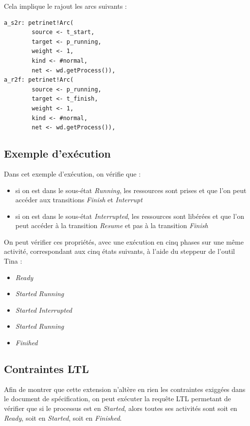 Cela implique le rajout les arcs suivants :
\begin{verbatim}
a_s2r: petrinet!Arc(
        source <- t_start,
        target <- p_running,
        weight <- 1,
        kind <- #normal,
        net <- wd.getProcess()),
a_r2f: petrinet!Arc(
        source <- p_running,
        target <- t_finish,
        weight <- 1,
        kind <- #normal,
        net <- wd.getProcess()),
\end{verbatim}

\subsection{Exemple d'exécution}

Dans cet exemple d'exécution, on vérifie que :
\begin{itemize}
\item si on est dans le sous-état \textit{Running}, les ressources sont prises et que l'on peut accéder aux transitions \textit{Finish} et \textit{Interrupt}
\item si on est dans le sous-état \textit{Interrupted}, les ressources sont libérées et que l'on peut accéder à la transition \textit{Resume} et pas à la transition \textit{Finish}\\
\end{itemize}

On peut vérifier ces propriétés, avec une exécution en cinq phases sur une même activité, correspondant aux cinq états suivants, à l'aide du steppeur de l'outil Tina : 
\begin{itemize}
\item \textit{Ready}
\item \textit{Started} \textit{Running}
\item \textit{Started} \textit{Interrupted}
\item \textit{Started} \textit{Running}
\item \textit{Finihed}
\end{itemize}

\subsection{Contraintes LTL}

Afin de montrer que cette extension n'altère en rien les contraintes exiggées dans le document de spécification, on peut exécuter la requête LTL permetant de vérifier que si le processus est en \textit{Started}, alors toutes ses activités sont soit en \textit{Ready}, soit en \textit{Started}, soit en \textit{Finished}.


